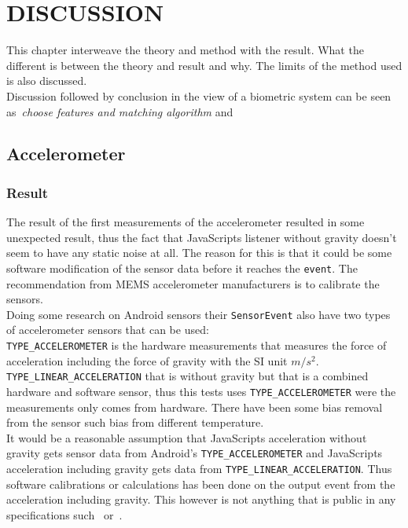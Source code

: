\chapter{DISCUSSION}\label{cha:discussion}
This chapter interweave the theory and method with the result. What the different is between the theory and result and why. The limits of the method used is also discussed. \\
Discussion followed by conclusion in the view of a biometric system can be seen as~\textit{choose features and matching algorithm} and~\textit{}

\section{Accelerometer}
\subsection{Result}
The result of the first measurements of the accelerometer resulted in some unexpected result, thus the fact that JavaScripts listener without gravity doesn't seem to have any static noise at all. The reason for this is that it could be some software modification of the sensor data before it reaches the \texttt{event}. The recommendation from MEMS accelerometer manufacturers is to calibrate the sensors.~\cite[]{acc:kionixerr}\\ 
Doing some research on Android sensors their \texttt{SensorEvent} also have two types of accelerometer sensors that can be used: \\
\texttt{TYPE\_ACCELEROMETER} is the hardware measurements that measures the force of acceleration including the force of gravity with the SI unit $m/s^2$. \\
\texttt{TYPE\_LINEAR\_ACCELERATION} that is without gravity but that is a combined hardware and software sensor, thus this tests uses \texttt{TYPE\_ACCELEROMETER} were the measurements only comes from hardware. There have been some bias removal from the sensor such bias from different temperature. \cite[]{android:sensorEvent}\\
It would be a reasonable assumption that JavaScripts acceleration without gravity gets sensor data from Android's \texttt{TYPE\_ACCELEROMETER} and JavaScripts acceleration including gravity gets data from \texttt{TYPE\_LINEAR\_ACCELERATION}. Thus software calibrations or calculations has been done on the output event from the acceleration including gravity. This however is not anything that is public in any specifications such~\cite[]{sensor:W3Cspec} or~\cite[]{sensor:accIncludingGravity}.\\ 
